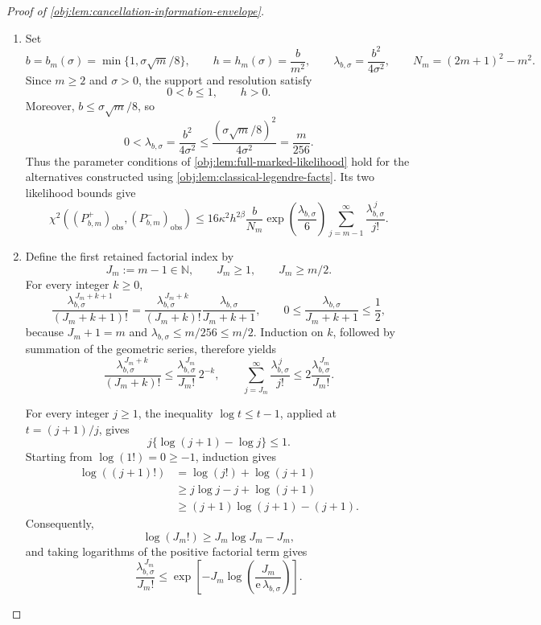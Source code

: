 \begin{proof}[Proof of \cref{obj:lem:cancellation-information-envelope}]
\begin{enumerate}
\item Set
\[
b=b_m(\sigma)=\min\{1,\sigma\sqrt m/8\},
\qquad
h=h_m(\sigma)=\frac{b}{m^2},
\qquad
\lambda_{b,\sigma}=\frac{b^2}{4\sigma^2},
\qquad
N_m=(2m+1)^2-m^2.
\]
Since \(m\ge2\) and \(\sigma>0\), the support and resolution satisfy
\[
0<b\le1,\qquad h>0.
\]
Moreover, \(b\le\sigma\sqrt m/8\), so
\[
0<\lambda_{b,\sigma}
=\frac{b^2}{4\sigma^2}
\le
\frac{(\sigma\sqrt m/8)^2}{4\sigma^2}
=\frac{m}{256}.
\]
Thus the parameter conditions of \cref{obj:lem:full-marked-likelihood} hold for the alternatives constructed using \cref{obj:lem:classical-legendre-facts}. Its two likelihood bounds give
\[
\chi^2\!\left((P^+_{b,m})_{\mathrm{obs}},
             (P^-_{b,m})_{\mathrm{obs}}\right)
\le
16\kappa^2h^{2\beta}\frac{b}{N_m}
\exp\!\left(\frac{\lambda_{b,\sigma}}6\right)
\sum_{j=m-1}^{\infty}\frac{\lambda_{b,\sigma}^{\,j}}{j!}.
\]

\item Define the first retained factorial index by
\[
J_m:=m-1\in\mathbb N,
\qquad J_m\ge1,\qquad J_m\ge m/2.
\]
For every integer \(k\ge0\),
\[
\frac{\lambda_{b,\sigma}^{\,J_m+k+1}}{(J_m+k+1)!}
=
\frac{\lambda_{b,\sigma}^{\,J_m+k}}{(J_m+k)!}
\frac{\lambda_{b,\sigma}}{J_m+k+1},
\qquad
0\le\frac{\lambda_{b,\sigma}}{J_m+k+1}
\le\frac12,
\]
because \(J_m+1=m\) and \(\lambda_{b,\sigma}\le m/256\le m/2\).
Induction on \(k\), followed by summation of the geometric series, therefore yields
\[
\frac{\lambda_{b,\sigma}^{\,J_m+k}}{(J_m+k)!}
\le
\frac{\lambda_{b,\sigma}^{\,J_m}}{J_m!}\,2^{-k},
\qquad
\sum_{j=J_m}^{\infty}\frac{\lambda_{b,\sigma}^{\,j}}{j!}
\le
2\frac{\lambda_{b,\sigma}^{\,J_m}}{J_m!}.
\]

For every integer \(j\ge1\), the inequality
\(\log t\le t-1\), applied at \(t=(j+1)/j\), gives
\[
j\{\log(j+1)-\log j\}\le1.
\]
Starting from \(\log(1!)=0\ge-1\), induction gives
\[
\begin{aligned}
\log((j+1)!)
&=\log(j!)+\log(j+1)\\
&\ge j\log j-j+\log(j+1)\\
&\ge (j+1)\log(j+1)-(j+1).
\end{aligned}
\]
Consequently,
\[
\log(J_m!)\ge J_m\log J_m-J_m,
\]
and taking logarithms of the positive factorial term gives
\[
\frac{\lambda_{b,\sigma}^{\,J_m}}{J_m!}
\le
\exp\!\left[
-J_m\log\!\left(\frac{J_m}{\mathrm e\,\lambda_{b,\sigma}}\right)
\right].
\]


\end{enumerate}
\end{proof}
